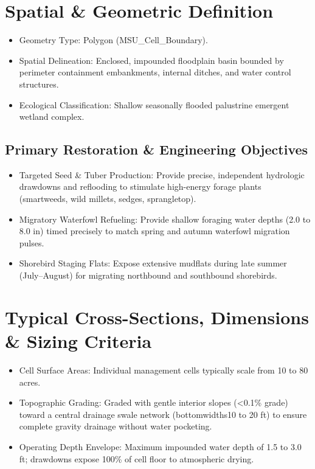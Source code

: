 \documentclass[
  letterpaper,
  DIV=11,
  numbers=noendperiod]{scrreprt}
\begin{document}
\section{Spatial \& Geometric
Definition}\label{spatial-geometric-definition-8}

\begin{itemize}
\item
  Geometry Type: Polygon (MSU\_Cell\_Boundary).
\item
  Spatial Delineation: Enclosed, impounded floodplain basin bounded by
  perimeter containment embankments, internal ditches, and water control
  structures.
\item
  Ecological Classification: Shallow seasonally flooded palustrine
  emergent wetland complex.
\end{itemize}

\subsection{Primary Restoration \& Engineering
Objectives}\label{primary-restoration-engineering-objectives-7}

\begin{itemize}
\item
  Targeted Seed \& Tuber Production: Provide precise, independent
  hydrologic drawdowns and reflooding to stimulate high-energy forage
  plants (smartweeds, wild millets, sedges, sprangletop).
\item
  Migratory Waterfowl Refueling: Provide shallow foraging water depths
  (2.0 to 8.0 in) timed precisely to match spring and autumn waterfowl
  migration pulses.
\item
  Shorebird Staging Flats: Expose extensive mudflats during late summer
  (July--August) for migrating northbound and southbound shorebirds.
\end{itemize}

\section{Typical Cross-Sections, Dimensions \& Sizing
Criteria}\label{typical-cross-sections-dimensions-sizing-criteria-6}

\begin{itemize}
\item
  Cell Surface Areas: Individual management cells typically scale from
  10 to 80 acres.
\item
  Topographic Grading: Graded with gentle interior slopes
  (\textless0.1\% grade) toward a central drainage swale network
  (bottomwidths10 to 20 ft) to ensure complete gravity drainage without
  water pocketing.
\item
  Operating Depth Envelope: Maximum impounded water depth of 1.5 to 3.0
  ft; drawdowns expose 100\% of cell floor to atmospheric drying.
\end{itemize}
\end{document}
